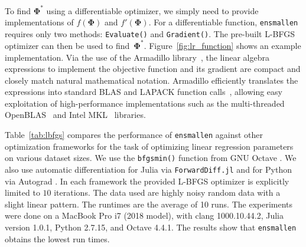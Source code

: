 \documentclass[twoside,11pt]{article}
\begin{document}
To find $\bm \Phi^*$ using a differentiable optimizer,
we simply need to provide implementations of $f(\bm \Phi)$ and $f'(\bm \Phi)$.
For a differentiable function, {\tt ensmallen} requires only two methods:
{\tt Evaluate()} and {\tt Gradient()}.
The pre-built L-BFGS optimizer can then be used to find~$\bm \Phi^*$.
Figure~\ref{fig:lr_function} shows an example implementation.
Via the use of the Armadillo library~\citep{sanderson2016armadillo},
the linear algebra expressions to implement the objective function and its gradient
are compact and closely match natural mathematical notation.
Armadillo efficiently translates the expressions into standard BLAS and LAPACK function calls~\citep{anderson1999lapack},
allowing easy exploitation of high-performance implementations such as the multi-threaded \mbox{OpenBLAS}~\citep{OpenBLAS} and Intel MKL~\citep{IntelMKL} libraries.

Table~\ref{tab:lbfgs} compares the performance
of {\tt ensmallen} against other optimization frameworks
for the task of optimizing linear regression parameters on various dataset sizes.
We use the {\tt bfgsmin()} function from GNU Octave \citep{octave}.
We also use automatic differentiation for Julia via {\tt ForwardDiff.jl} \citep{RevelsLubinPapamarkou2016}
and for Python via Autograd \citep{maclaurin2015autograd}.
In each framework the provided L-BFGS optimizer is explicitly limited to $10$ iterations.
The data used are highly noisy random data with a slight linear pattern.
The runtimes are the average of 10 runs.
The experiments were done on a MacBook Pro i7 (2018 model),
with clang 1000.10.44.2, Julia version 1.0.1, Python 2.7.15, and Octave 4.4.1.
The results show that {\tt ensmallen} obtains the lowest run times.
\end{document}
